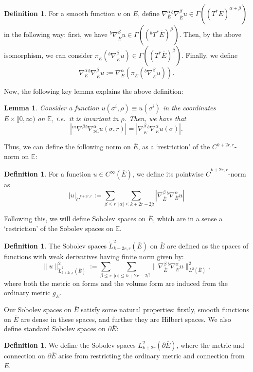 \documentclass[10pt, a4paper]{article}
\theoremstyle{plain}%
\newtheorem{lem}[theorem]{Lemma}
\theoremstyle{definition}
\newtheorem{defn}[theorem]{Definition}
\numberwithin{figure}{section}
\numberwithin{equation}{section}
\newcommand{\bE}{\mathbb{E}}
\newcommand{\pa}{\partial}
\newcommand{\rel}{\mathrm{rel}}
\newcommand{\oE}{{\overline{E}}}
\newcommand{\chC}{\check{C}}
\begin{document}
\begin{defn}
	For a smooth function $u$ on $\oE$, define $\nabla_{\oE}^\alpha {^b\nabla_{\oE}^\beta} u \in \Gamma((T^*\oE)^{\alpha+\beta})$ in the following way: first, we have ${^b\nabla_{\oE}^\beta}u \in \Gamma((^bT^*\oE)^\beta)$. Then, by the above isomorphism, we can consider $\pi_{\oE}({^b\nabla_{\oE}^\beta}u)\in \Gamma((T^*\oE)^\beta)$. Finally, we define \[\nabla_{\oE}^\alpha {^b\nabla_{\oE}^\beta} u := \nabla_{\oE}^\alpha\left(\pi_{\oE}({^b\nabla_{\oE}^\beta}u)\right).
	\]
\end{defn}
Now, the following key lemma explains the above definition:
\begin{lem}
	Consider a function $u(\sigma^i,\rho) \equiv u(\sigma^i)$ in the coordinates $\oE\times \llbracket0,\infty)$ on $\bE$, i.e.\ it is invariant in $\rho$. Then, we have that \[
	|^m\nabla^\beta {^b\nabla^\alpha_\rel}u(\sigma,r)|  = |\nabla^\beta_{\oE}{^b\nabla^\alpha_\oE}u(\sigma)|.
	\]
\end{lem}
Thus, we can define the following norm on $\oE$, as a `restriction' of the $C^{k+2r,r}$-norm on $\bE$:
\begin{defn}
	For a function $u\in C^\infty(\oE)$, we define its pointwise $\chC^{k+2r,r}$-norm as \[
	|u|_{\chC^{k+2r,r}} := \sum_{\beta\leq r}  \sum_{|\alpha|\leq k+2r-2\beta}|\nabla_\oE^\beta {^b}\nabla^\alpha_{\oE} u|
	\]
\end{defn}

Following this, we will define Sobolev spaces on $\oE$, which are in a sense a `restriction' of the Sobolev spaces on $\bE$.
\begin{defn} The Sobolev spaces $\check{L}^2_{k+2r,r}(\oE)$ on $\oE$ are defined as the spaces of functions with weak derivatives having finite norm given by:
	\begin{equation}
		\|u\|^2_{\check{L}^2_{k+2r,r}(\oE)}:=  \sum_{\beta\leq r}  \sum_{|\alpha|\leq k+2r-2\beta}\|\nabla_\oE^\beta {^b}\nabla^\alpha_{\oE} u\|^2_{L^2(\oE)},  
	\end{equation}
	where both the metric on forms and the volume form are induced from the ordinary metric $g_\oE$.
\end{defn}

Our Sobolev spaces on $\oE$ satisfy some natural properties: firstly, smooth functions on $\oE$ are dense in these spaces, and further they are Hilbert spaces. We also define standard Sobolev spaces on $\pa\oE$:
\begin{defn}
	We define the Sobolev spaces $L^2_{k+2r}(\pa\oE)$, where the metric and connection on $\pa\oE$ arise from restricting the ordinary metric and connection from $\oE$.
\end{defn}
\end{document}

